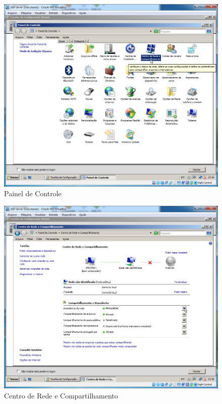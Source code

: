 \documentclass[10pt]{article}
\begin{document}
\begin{figure}[H]
    \centering
    \caption{Painel de Controle}
    \label{fig:4231}
    \includegraphics[width=\linewidth]{images/configuracao_windows/windows_server/021.png}
\end{figure}
\begin{figure}[H]
    \centering
    \caption{Centro de Rede e Compartilhamento}
    \label{fig:4232}
    \includegraphics[width=\linewidth]{images/configuracao_windows/windows_server/022.png}
\end{figure}
\end{document}
